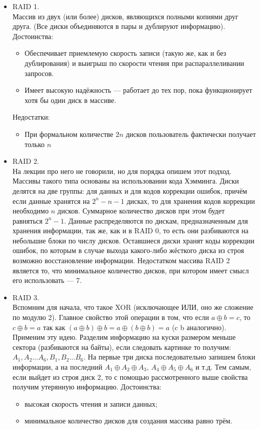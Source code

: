 \begin {itemize}
\item RAID 1. \\
Массив из двух (или более) дисков, являющихся полными копиями друг друга. (Все диски объединяются в пары и дублируют информацию).
Достоинства:
\begin {itemize}
\item Обеспечивает приемлемую скорость записи (такую же, как и без дублирования) и выигрыш по скорости чтения при распараллеливании запросов.
\item Имеет высокую надёжность — работает до тех пор, пока функционирует хотя бы один диск в массиве.
\end {itemize}

Недостатки:
\begin {itemize}
\item При формальном количестве $2n$ дисков пользователь фактически получает только $n$
\end {itemize}

\item RAID 2. \\
На лекции про него не говорили, но для порядка опишем этот подход. Массивы такого типа основаны на использовании кода Хэмминга. Диски делятся на две группы: для данных и для кодов коррекции ошибок, причём если данные хранятся на $2^n - n- 1$ дисках, то для хранения кодов коррекции необходимо $n$ дисков. Суммарное количество дисков при этом будет равняться $2^n - 1$. Данные распределяются по дискам, предназначенным для хранения информации, так же, как и в RAID 0, то есть они разбиваются на небольшие блоки по числу дисков. Оставшиеся диски хранят коды коррекции ошибок, по которым в случае выхода какого-либо жёсткого диска из строя возможно восстановление информации. Недостатком массива RAID 2 является то, что минимальное количество дисков, при котором имеет смысл его использовать — 7.

\item RAID 3. \\
Вспомним для начала, что такое XOR (исключающее ИЛИ, оно же сложение по модулю 2). Главное свойство этой операции в том, что если 
$a \oplus b = c$, то $c \oplus b = a$ так как $(a \oplus b) \oplus b = a \oplus (b \oplus b) = a$ (c b аналогично). \\
Применим эту идею. Разделим информацию на куски размером меньше сектора (разбиваются на байты), если следовать картинке то получим: $A_1, A_2 ... A_6, B_1, B_2 ... B_6$. На первые три диска последовательно запишем блоки информации, а на последний $A_1 \oplus A_2 \oplus A_3$, $A_4 \oplus A_5 \oplus A_6$ и т.д. Тем самым, если выйдет из строя диск 2, то с помощью рассмотренного выше свойства получим утерянную информацию.
Достоинства:
\begin {itemize}
\item высокая скорость чтения и записи данных;
\item минимальное количество дисков для создания массива равно трём.
\end {itemize}


\end{itemize}
